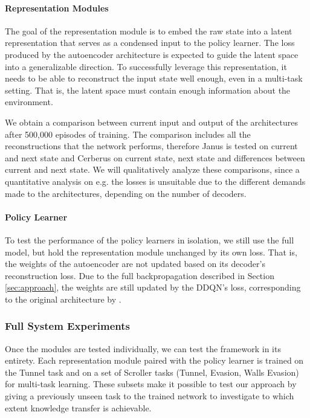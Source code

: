 \paragraph{Representation Modules}

The goal of the representation module is to embed the raw state into a latent representation that serves as a condensed input to the policy learner. The loss produced by the autoencoder architecture is expected to guide the latent space into a generalizable direction. To successfully leverage this representation, it needs to be able to reconstruct the input state well enough, even in a multi-task setting. That is, the latent space must contain enough information about the environment.

We obtain a comparison between current input and output of the architectures after 500,000 episodes of training. The comparison includes all the reconstructions that the network performs, therefore Janus is tested on current and next state and Cerberus on current state, next state and differences between current and next state. We will qualitatively analyze these comparisons, since a quantitative analysis on e.g. the losses is unsuitable due to the different demands made to the architectures, depending on the number of decoders. 

\paragraph{Policy Learner}
To test the performance of the policy learners in isolation, we still use the full model, but hold the representation module unchanged by its own loss.
That is, the weights of the autoencoder are not updated based on its decoder's reconstruction loss.
Due to the full backpropagation described in Section \ref{sec:approach}, the weights are still updated by the DDQN's loss, corresponding to the original architecture by \citet{DQN}. 

\subsubsection{Full System Experiments}
\label{full-system-experiment}
Once the modules are tested individually, we can test the framework in its entirety.
Each representation module paired with the policy learner is trained on the Tunnel task and on a set of Scroller tasks (Tunnel, Evasion, Walls Evasion) for multi-task learning. 
These subsets make it possible to test our approach by giving a previously unseen task to the trained network to investigate to which extent knowledge transfer is achievable.

